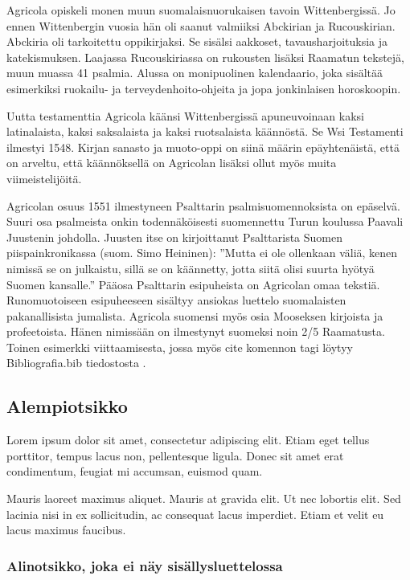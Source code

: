 Agricola opiskeli monen muun suomalaisnuorukaisen tavoin Wittenbergissä. Jo ennen Wittenbergin vuosia hän oli saanut valmiiksi Abckirian ja Rucouskirian. Abckiria oli tarkoitettu oppikirjaksi. Se sisälsi aakkoset, tavausharjoituksia ja katekismuksen. Laajassa Rucouskiriassa on rukousten lisäksi Raamatun tekstejä, muun muassa 41 psalmia. Alussa on monipuolinen kalendaario, joka sisältää esimerkiksi ruokailu- ja terveydenhoito-ohjeita ja jopa jonkinlaisen horoskoopin.

Uutta testamenttia Agricola käänsi Wittenbergissä apuneuvoinaan kaksi latinalaista, kaksi saksalaista ja kaksi ruotsalaista käännöstä. Se Wsi Testamenti ilmestyi 1548. Kirjan sanasto ja muoto-oppi on siinä määrin epäyhtenäistä, että on arveltu, että käännöksellä on Agricolan lisäksi ollut myös muita viimeistelijöitä.

Agricolan osuus 1551 ilmestyneen Psalttarin psalmisuomennoksista on epäselvä. Suuri osa psalmeista onkin todennäköisesti suomennettu Turun koulussa Paavali Juustenin johdolla. Juusten itse on kirjoittanut Psalttarista Suomen piispainkronikassa (suom. Simo Heininen): ”Mutta ei ole ollenkaan väliä, kenen nimissä se on julkaistu, sillä se on käännetty, jotta siitä olisi suurta hyötyä Suomen kansalle.” Pääosa Psalttarin esipuheista on Agricolan omaa tekstiä. Runomuotoiseen esipuheeseen sisältyy ansiokas luettelo suomalaisten pakanallisista jumalista. Agricola suomensi myös osia Mooseksen kirjoista ja profeetoista. Hänen nimissään on ilmestynyt suomeksi noin 2/5 Raamatusta. Toinen esimerkki viittaamisesta, jossa myös cite komennon tagi löytyy Bibliografia.bib tiedostosta \cite{puasuareanu2009survey}.

\subsection{Alempiotsikko}
\label{Alempiotsikko}

Lorem ipsum dolor sit amet, consectetur adipiscing elit. Etiam eget tellus porttitor, tempus lacus non, pellentesque ligula. Donec sit amet erat condimentum, feugiat mi accumsan, euismod quam.

Mauris laoreet maximus aliquet. Mauris at gravida elit. Ut nec lobortis elit. Sed lacinia nisi in ex sollicitudin, ac consequat lacus imperdiet. Etiam et velit eu lacus maximus faucibus.

\subsubsection{Alinotsikko, joka ei näy sisällysluettelossa}
\label{Alinotsikko}

